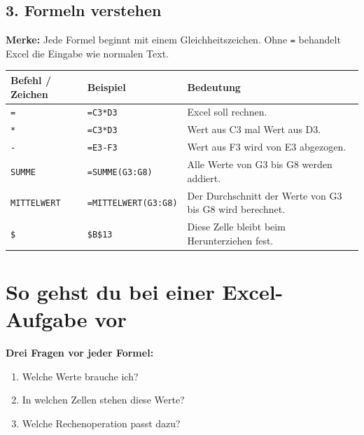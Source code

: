 \newpage
\subsection*{3. Formeln verstehen}
\begin{boxK}
\textbf{Merke:} Jede Formel beginnt mit einem Gleichheitszeichen. Ohne \texttt{=} behandelt Excel die Eingabe wie normalen Text.
\end{boxK}

\renewcommand{\arraystretch}{1.35}
\begin{tabularx}{\textwidth}{|>{\raggedright\arraybackslash}p{3.2cm}|>{\raggedright\arraybackslash}p{4.2cm}|>{\raggedright\arraybackslash}X|}
\hline
\rowcolor{gray!20}\textbf{Befehl / Zeichen} & \textbf{Beispiel} & \textbf{Bedeutung} \\\hline
\texttt{=} & \texttt{=C3*D3} & Excel soll rechnen. \\\hline
\texttt{*} & \texttt{=C3*D3} & Wert aus C3 mal Wert aus D3. \\\hline
\texttt{-} & \texttt{=E3-F3} & Wert aus F3 wird von E3 abgezogen. \\\hline
\texttt{SUMME} & \texttt{=SUMME(G3:G8)} & Alle Werte von G3 bis G8 werden addiert. \\\hline
\texttt{MITTELWERT} & \texttt{=MITTELWERT(G3:G8)} & Der Durchschnitt der Werte von G3 bis G8 wird berechnet. \\\hline
\texttt{\$} & \texttt{\$B\$13} & Diese Zelle bleibt beim Herunterziehen fest. \\\hline
\end{tabularx}

\section*{So gehst du bei einer Excel-Aufgabe vor}

\begin{boxK}
\textbf{Drei Fragen vor jeder Formel:}
\begin{enumerate}[label=\arabic*)]
  \item Welche Werte brauche ich?
  \item In welchen Zellen stehen diese Werte?
  \item Welche Rechenoperation passt dazu?
\end{enumerate}
\end{boxK}

